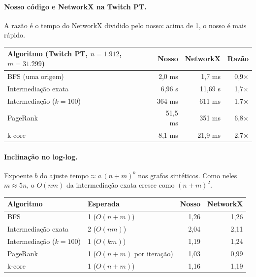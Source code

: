 \paragraph{Nosso código e NetworkX na Twitch PT.} A razão é o tempo do NetworkX dividido pelo
nosso: acima de 1, o nosso é mais rápido.

{\small\begin{tabularx}{\linewidth}{@{}Y r r r@{}}
\toprule
Algoritmo (Twitch PT, $n = 1.912$, $m = 31.299$) & Nosso & NetworkX & Razão \\
\midrule
BFS (uma origem) & 2,0 ms & 1,7 ms & 0,9$\times$ \\
Intermediação exata & 6,96 s & 11,69 s & 1,7$\times$ \\
Intermediação ($k = 100$) & 364 ms & 611 ms & 1,7$\times$ \\
PageRank & 51,5 ms & 351 ms & 6,8$\times$ \\
k-core & 8,1 ms & 21,9 ms & 2,7$\times$ \\
\bottomrule
\end{tabularx}}

\paragraph{Inclinação no log-log.} Expoente $b$ do ajuste $\text{tempo} \approx a\,(n + m)^b$ nos
grafos sintéticos. Como neles $m \approx 5n$, o $O(nm)$ da intermediação exata cresce como
$(n + m)^2$.

{\small\begin{tabularx}{\linewidth}{@{}Y L{4.4cm} r r@{}}
\toprule
Algoritmo & Esperada & Nosso & NetworkX \\
\midrule
BFS & 1 ($O(n + m)$) & 1,26 & 1,26 \\
Intermediação exata & 2 ($O(nm)$) & 2,04 & 2,11 \\
Intermediação ($k = 100$) & 1 ($O(km)$) & 1,19 & 1,24 \\
PageRank & 1 ($O(n + m)$ por iteração) & 1,03 & 0,99 \\
k-core & 1 ($O(n + m)$) & 1,16 & 1,19 \\
\bottomrule
\end{tabularx}}

